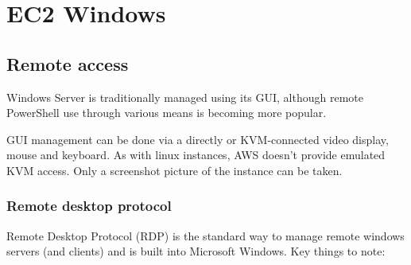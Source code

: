
\chapter{EC2 Windows}


\section{Remote access}

Windows Server is traditionally managed using its GUI, although remote
PowerShell use through various means is becoming more popular.

GUI management can be done via a directly or KVM-connected video
display, mouse and keyboard. As with linux instances, AWS doesn't
provide emulated KVM access. Only a screenshot picture of the instance
can be taken.

\subsection{Remote desktop protocol}\label{remote-desktop-protocol}

Remote Desktop Protocol
(RDP) is the standard way to manage remote windows servers (and clients)
and is built into Microsoft Windows. Key things to note:

